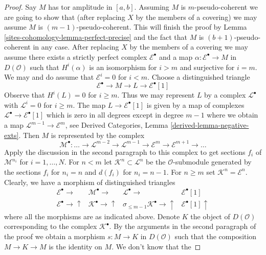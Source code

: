 \begin{proof}
\medskip\noindent
Say $M$ has tor amplitude in $[a, b]$. Assuming $M$ is $m$-pseudo-coherent
we are going to show that (after replacing $X$ by the members of a covering)
we may assume $M$ is $(m - 1)$-pseudo-coherent. This will finish the proof by
Lemma \ref{sites-cohomology-lemma-perfect-precise} and the fact that
$M$ is $(b + 1)$-pseudo-coherent in any case. After replacing $X$
by the members of a covering we may assume there exists a strictly perfect
complex $\mathcal{E}^\bullet$ and a map $\alpha : \mathcal{E}^\bullet \to M$
in $D(\mathcal{O})$ such that $H^i(\alpha)$ is an isomorphism for
$i > m$ and surjective for $i = m$. We may and do assume
that $\mathcal{E}^i = 0$ for $i < m$. Choose a distinguished triangle
$$
\mathcal{E}^\bullet \to M \to L \to \mathcal{E}^\bullet[1]
$$
Observe that $H^i(L) = 0$ for $i \geq m$. Thus we may represent
$L$ by a complex $\mathcal{L}^\bullet$ with $\mathcal{L}^i = 0$
for $i \geq m$. The map $L \to \mathcal{E}^\bullet[1]$
is given by a map of complexes
$\mathcal{L}^\bullet \to \mathcal{E}^\bullet[1]$
which is zero in all degrees except in degree $m - 1$
where we obtain a map $\mathcal{L}^{m - 1} \to \mathcal{E}^m$, see
Derived Categories, Lemma \ref{derived-lemma-negative-exts}.
Then $M$ is represented by the complex
$$
\mathcal{M}^\bullet :
\ldots \to
\mathcal{L}^{m - 2} \to
\mathcal{L}^{m - 1} \to
\mathcal{E}^m \to
\mathcal{E}^{m + 1} \to \ldots
$$
Apply the discussion in the second paragraph to this complex to get
sections $f_i$ of $\mathcal{M}^{n_i}$ for $i = 1, \ldots, N$.
For $n < m$ let $\mathcal{K}^n \subset \mathcal{L}^n$
be the $\mathcal{O}$-submodule generated by the sections
$f_i$ for $n_i = n$ and $d(f_i)$ for $n_i = n - 1$.
For $n \geq m$ set $\mathcal{K}^n = \mathcal{E}^n$.
Clearly, we have a morphism of
distinguished triangles
$$
\begin{array}{cccc}\mathcal{E}^\bullet \longrightarrow & \mathcal{M}^\bullet \longrightarrow & \mathcal{L}^\bullet \longrightarrow & \mathcal{E}^\bullet[1] \\ \mathcal{E}^\bullet \longrightarrow\uparrow & \mathcal{K}^\bullet \longrightarrow\uparrow & \sigma_{\leq m - 1}\mathcal{K}^\bullet \longrightarrow\uparrow & \mathcal{E}^\bullet[1] \uparrow\end{array}
$$
where all the morphisms are as indicated above.
Denote $K$ the object of $D(\mathcal{O})$ corresponding to the complex
$\mathcal{K}^\bullet$.
By the arguments in the second paragraph of the proof we obtain
a morphism $s : M \to K$ in $D(\mathcal{O})$ such that the composition
$M \to K \to M$ is the identity on $M$. We don't know that the

\end{proof}
